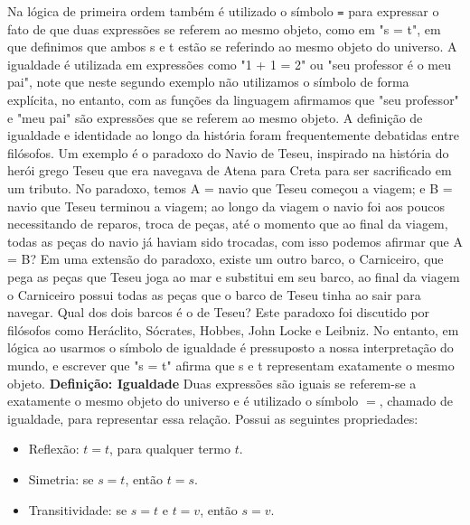         Na lógica de primeira ordem também é utilizado o símbolo \lstinline{=} para expressar o fato de que duas
        expressões se referem ao mesmo objeto, como em "s = t", em que definimos que ambos s e t estão se referindo
        ao mesmo objeto do universo. A igualdade é utilizada em expressões como "1 + 1 = 2" ou "seu professor é o
        meu pai", note que neste segundo exemplo não utilizamos o símbolo de forma explícita, no entanto, com as 
        funções da linguagem afirmamos que "seu professor" e "meu pai" são expressões que se referem ao mesmo objeto.
        \newline A definição de igualdade e identidade ao longo da história foram frequentemente debatidas entre
        filósofos. Um exemplo é o paradoxo do Navio de Teseu, inspirado na história do herói grego Teseu que era
        navegava de Atena para Creta para ser sacrificado em um tributo. No paradoxo, temos A = navio 
        que Teseu começou a viagem; e B = navio que Teseu terminou a viagem; ao longo da viagem o navio foi aos poucos
        necessitando de reparos, troca de peças, até o momento que ao final da viagem, todas as peças do navio já
        haviam sido trocadas, com isso podemos afirmar que A = B? Em uma extensão do paradoxo, existe um outro barco,
        o Carniceiro, que pega as peças que Teseu joga ao mar e substitui em seu barco, ao final da viagem o Carniceiro
        possui todas as peças que o barco de Teseu tinha ao sair para navegar. Qual dos dois barcos é o de Teseu? Este paradoxo
        foi discutido por filósofos como Heráclito, Sócrates, Hobbes, John Locke e Leibniz. No entanto, em lógica ao usarmos
        o símbolo de igualdade é pressuposto a nossa interpretação do mundo, e escrever que "s = t" afirma que
        s e t representam exatamente o mesmo objeto.
        \newline \textbf{Definição: Igualdade} Duas expressões são iguais se referem-se a exatamente o mesmo objeto do universo
        e é utilizado o símbolo $=$, chamado de igualdade, para representar essa relação. Possui as
        seguintes propriedades:
        \begin{itemize}
            \item Reflexão: $t = t$, para qualquer termo $t$.
            \item Simetria: se $s=t$, então $t=s$.
            \item Transitividade: se $s=t$ e $t=v$, então $s=v$.
        \end{itemize}
